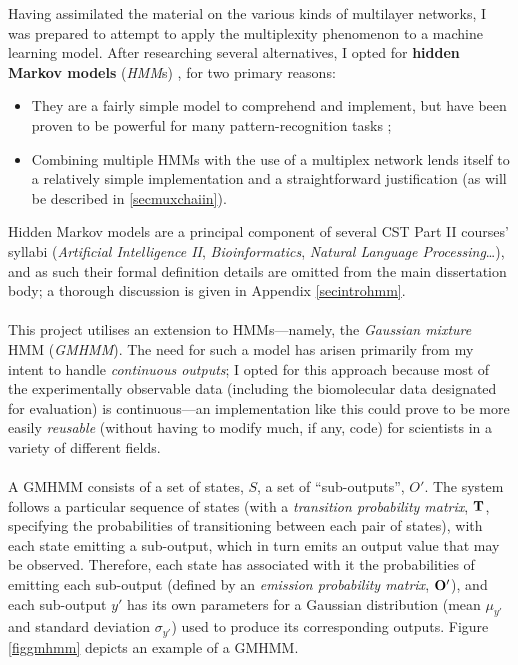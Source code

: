 \documentclass[12pt,a4paper,twoside,openright]{report}
\begin{document}
Having assimilated the material on the various kinds of multilayer networks, I was prepared to attempt to apply the multiplexity phenomenon to a machine learning model. After researching several alternatives, I opted for {\bf hidden Markov models} (\emph{HMM}s) \cite{baum1966statistical, baum1970maximization}, for two primary reasons:
\begin{itemize} 
	\item They are a fairly simple model to comprehend and implement, but have been proven to be powerful for many pattern-recognition tasks \cite{pardo2005modeling, satish1993use, starner1995real};
	\item Combining multiple HMMs with the use of a multiplex network lends itself to a relatively simple implementation and a straightforward justification (as will be described in \cref{secmuxchaiin}).
\end{itemize}
Hidden Markov models are a principal component of several CST Part II courses' syllabi (\emph{Artificial Intelligence II}, \emph{Bioinformatics}, \emph{Natural Language Processing}\dots), and as such their formal definition details are omitted from the main dissertation body; a thorough discussion is given in Appendix \ref{secintrohmm}.\\ \\
This project utilises an extension to HMMs---namely, the \emph{Gaussian mixture} HMM (\emph{GMHMM}). The need for such a model has arisen primarily from my intent to handle \emph{continuous outputs}; I opted for this approach because most of the experimentally observable data (including the biomolecular data designated for evaluation) is continuous---an implementation like this could prove to be more easily \emph{reusable} (without having to modify much, if any, code) for scientists in a variety of different fields.\\ \\
A GMHMM consists of a set of states, $S$, a set of ``sub-outputs'', $O'$. The system follows a particular sequence of states (with a \emph{transition probability matrix}, $\bf T$, specifying the probabilities of transitioning between each pair of states), with each state emitting a sub-output, which in turn emits an output value that may be observed. Therefore, each state has associated with it the probabilities of emitting each sub-output (defined by an \emph{emission probability matrix}, $\bf O'$), and each sub-output $y'$ has its own parameters for a Gaussian distribution (mean $\mu_{y'}$ and standard deviation $\sigma_{y'}$) used to produce its corresponding outputs. Figure \ref{figgmhmm} depicts an example of a GMHMM.
\end{document}
